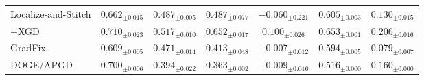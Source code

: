 \documentclass{article} %
\begin{document}
\begin{table}[t]
\begin{tabular}{lcccccc}
Localize-and-Stitch      & $0.662_{\pm0.015}$ & $0.487_{\pm0.005}$ & $0.487_{\pm0.077}$ & $-0.060_{\pm0.221}$ & $0.605_{\pm0.003}$ & $0.130_{\pm0.015}$ \\
\quad $+$XGD             & $0.710_{\pm0.023}$ & $0.517_{\pm0.010}$ & $0.652_{\pm0.017}$ & $0.100_{\pm0.026}$ & $0.653_{\pm0.001}$ & $0.206_{\pm0.016}$ \\
GradFix                  & $0.609_{\pm0.005}$ & $0.471_{\pm0.014}$ & $0.413_{\pm0.048}$ & $-0.007_{\pm0.012}$ & $0.594_{\pm0.005}$ & $0.079_{\pm0.007}$ \\
DOGE/APGD                & $0.700_{\pm0.006}$ & $0.394_{\pm0.022}$ & $0.363_{\pm0.002}$ & $-0.009_{\pm0.016}$ & $0.516_{\pm0.000}$ & $0.160_{\pm0.000}$ \\
\bottomrule
\end{tabular}
\end{table}
\end{document}
